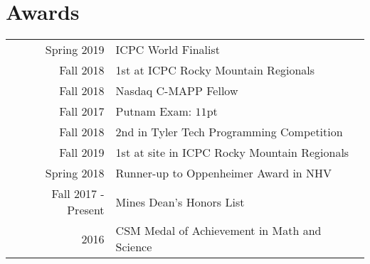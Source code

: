 \documentclass[]{deedy-resume-openfont}
\begin{document}
\begin{minipage}[t]{0.55\textwidth}

\section{Awards} 
\begin{tabular}{rl}
Spring 2019 & ICPC World Finalist \\
Fall 2018 & 1st at ICPC Rocky Mountain Regionals \\
Fall 2018 & Nasdaq C-MAPP Fellow \\
Fall 2017 & Putnam Exam: \(11\)pt \\
Fall 2018 & 2nd in Tyler Tech Programming Competition \\
Fall 2019 & 1st at site in ICPC Rocky Mountain Regionals \\
Spring 2018 & Runner-up to Oppenheimer Award in NHV \\
Fall 2017 - Present & Mines Dean's Honors List \\
2016	     & CSM Medal of Achievement in Math and Science \\
\end{tabular}

\end{minipage} 
\end{document}
